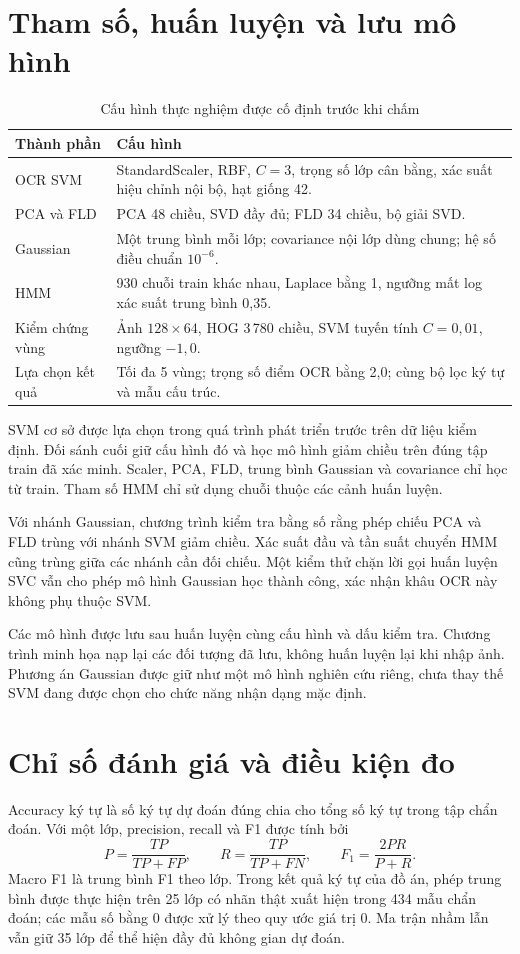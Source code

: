 \section{Tham số, huấn luyện và lưu mô hình}
\begin{table}[H]\centering
\caption{Cấu hình thực nghiệm được cố định trước khi chấm}
\begin{tabularx}{\textwidth}{p{4.2cm}Y}
\toprule
Thành phần & Cấu hình\\
\midrule
OCR SVM & StandardScaler, RBF, $C=3$, trọng số lớp cân bằng, xác suất hiệu chỉnh nội bộ, hạt giống 42.\\
PCA và FLD & PCA 48 chiều, SVD đầy đủ; FLD 34 chiều, bộ giải SVD.\\
Gaussian & Một trung bình mỗi lớp; covariance nội lớp dùng chung; hệ số điều chuẩn $10^{-6}$.\\
HMM & 930 chuỗi train khác nhau, Laplace bằng 1, ngưỡng mất log xác suất trung bình 0,35.\\
Kiểm chứng vùng & Ảnh $128\times64$, HOG 3\,780 chiều, SVM tuyến tính $C=0,01$, ngưỡng $-1,0$.\\
Lựa chọn kết quả & Tối đa 5 vùng; trọng số điểm OCR bằng 2,0; cùng bộ lọc ký tự và mẫu cấu trúc.\\
\bottomrule
\end{tabularx}
\end{table}

SVM cơ sở được lựa chọn trong quá trình phát triển trước trên dữ liệu kiểm định. Đối sánh cuối giữ cấu hình đó và học mô hình giảm chiều trên đúng tập train đã xác minh. Scaler, PCA, FLD, trung bình Gaussian và covariance chỉ học từ train. Tham số HMM chỉ sử dụng chuỗi thuộc các cảnh huấn luyện.

Với nhánh Gaussian, chương trình kiểm tra bằng số rằng phép chiếu PCA và FLD trùng với nhánh SVM giảm chiều. Xác suất đầu và tần suất chuyển HMM cũng trùng giữa các nhánh cần đối chiếu. Một kiểm thử chặn lời gọi huấn luyện SVC vẫn cho phép mô hình Gaussian học thành công, xác nhận khâu OCR này không phụ thuộc SVM.

Các mô hình được lưu sau huấn luyện cùng cấu hình và dấu kiểm tra. Chương trình minh họa nạp lại các đối tượng đã lưu, không huấn luyện lại khi nhập ảnh. Phương án Gaussian được giữ như một mô hình nghiên cứu riêng, chưa thay thế SVM đang được chọn cho chức năng nhận dạng mặc định.

\section{Chỉ số đánh giá và điều kiện đo}
Accuracy ký tự là số ký tự dự đoán đúng chia cho tổng số ký tự trong tập chẩn đoán. Với một lớp, precision, recall và F1 được tính bởi
\begin{equation}
P=\frac{TP}{TP+FP},\qquad R=\frac{TP}{TP+FN},\qquad
F_1=\frac{2PR}{P+R}.
\end{equation}
Macro F1 là trung bình F1 theo lớp. Trong kết quả ký tự của đồ án, phép trung bình được thực hiện trên 25 lớp có nhãn thật xuất hiện trong 434 mẫu chẩn đoán; các mẫu số bằng 0 được xử lý theo quy ước giá trị 0. Ma trận nhầm lẫn vẫn giữ 35 lớp để thể hiện đầy đủ không gian dự đoán.

